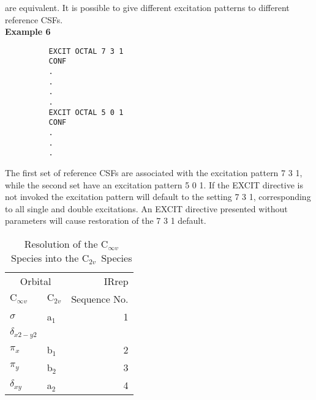 \documentclass[11pt,fleqn]{article}
\newcommand{\cinfv}{\mbox{C$_{\infty v}$}}
\newcommand{\ctwov}{\mbox{C$_{2v}$}}
\begin{document}
 are equivalent.
 It is possible to give different excitation patterns to different
reference CSFs.\\

{\bf  Example 6}
{
\footnotesize
\begin{verbatim}
          EXCIT OCTAL 7 3 1
          CONF
          .
          .
          .
          .
          EXCIT OCTAL 5 0 1
          CONF
          .
          .
          .
\end{verbatim}
}

The first set of reference CSFs are associated with the excitation
pattern 7 3 1, while the second set have an excitation
pattern 5 0 1.
If the EXCIT directive is not invoked the excitation pattern will default
to the setting 7 3 1, corresponding to all single and double excitations.
An EXCIT directive presented without parameters will cause restoration
of the 7 3 1 default.


\begin{table}
 \caption{\label{table:1}\ Resolution of the \cinfv\ Species into the \ctwov\ Species}

 \begin{centering}
 \begin{tabular}{llr}
 \\ \hline\hline
\multicolumn{2}{c}{Orbital} &  IRrep  \\
         \cline{1-2}
    $\cinfv$ & $\ctwov$ & Sequence No. \\ \cline{1-3}

 $\sigma$         &   a$_{1}$         &    1 \\
 $\delta_{x2-y2}$ &                   &      \\
 $\pi_{x}$        &   b$_{1}$         &    2 \\
 $\pi_{y}$        &   b$_{2}$         &    3 \\
 $\delta_{xy}$    &   a$_{2}$         &    4 \\  \hline\hline
\end{tabular}

\end{centering}
\end{table}
\end{document}
